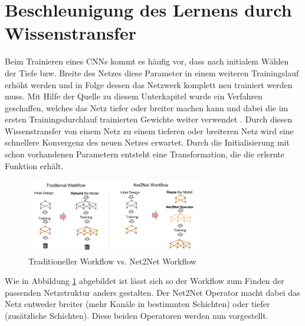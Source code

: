 \section{Beschleunigung des Lernens durch Wissenstransfer}
\label{sec:net2net}
Beim Trainieren eines CNNs kommt es häufig vor, dass nach initialem Wählen der Tiefe bzw. Breite des Netzes diese Parameter in einem weiteren Trainingslauf erhöht werden und in Folge dessen das Netzwerk komplett neu trainiert werden muss. Mit Hilfe der Quelle zu diesem Unterkapitel wurde ein Verfahren geschaffen, welches das Netz tiefer oder breiter machen kann und dabei die im ersten Trainingsdurchlauf trainierten Gewichte weiter verwendet \cite{net2net}. Durch diesen Wissenstransfer von einem Netz zu einem tieferen oder breiteren Netz wird eine schnellere Konvergenz des neuen Netzes erwartet. Durch die Initialisierung mit schon vorhandenen Parametern entsteht eine Transformation, die die erlernte Funktion erhält.

\begin{figure}[h]
 \centering
 \includegraphics[width=0.7\textwidth]{KapitelPartA/images/net2net.png}
 \caption{Traditioneller Workflow vs. Net2Net Workflow}
 \label{abb:net2net}
\end{figure}


Wie in Abbildung \ref{abb:net2net} abgebildet ist lässt sich so der Workflow zum Finden der passenden Netzstruktur anders gestalten. Der Net2Net Operator macht dabei das Netz entweder breiter (mehr Kanäle in bestimmten Schichten) oder tiefer (zusätzliche Schichten). Diese beiden Operatoren werden nun vorgestellt.

